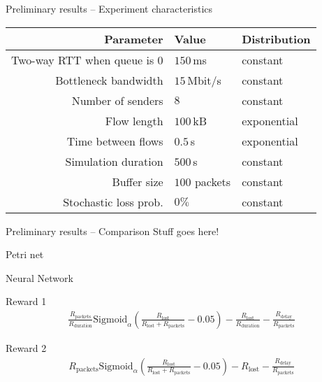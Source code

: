 \documentclass[11pt]{beamer}
\begin{document}
\begin{frame}{Preliminary results -- Experiment characteristics}
\centering
\begin{tabular}{rll}
\toprule
Parameter & Value & Distribution \\
\midrule
Two-way RTT when queue is 0 & $150\,$ms & constant \\
Bottleneck bandwidth & $15\,$Mbit/s & constant \\
Number of senders & $8$ & constant \\
Flow length & $100\,$kB & exponential \\
Time between flows & $0.5\,$s & exponential \\
Simulation duration & $500\,$s & constant \\
Buffer size & $100$ packets & constant \\
Stochastic loss prob. & $0\%$ & constant \\
\bottomrule
\end{tabular}
\end{frame}

\begin{frame}{Preliminary results -- Comparison}
Stuff goes here!

\end{frame}

\begin{frame}{Petri net}



\end{frame}

\begin{frame}{Neural Network}



\end{frame}

\begin{frame}{Reward 1}
\begin{align*}
\frac{R_\text{packets}}{R_\text{duration}}\text{Sigmoid}_\alpha\left(\frac{R_\text{lost}}{R_\text{lost} + R_\text{packets}} - 0.05\right) - \frac{R_\text{lost}}{R_\text{duration}} - \frac{R_\text{delay}}{R_\text{packets}}
\end{align*}
\end{frame}

\begin{frame}{Reward 2}
\begin{align*}
R_\text{packets}\text{Sigmoid}_\alpha\left(\frac{R_\text{lost}}{R_\text{lost} + R_\text{packets}} - 0.05\right) - R_\text{lost} - \frac{R_\text{delay}}{R_\text{packets}}
\end{align*}
\end{frame}
\end{document}
